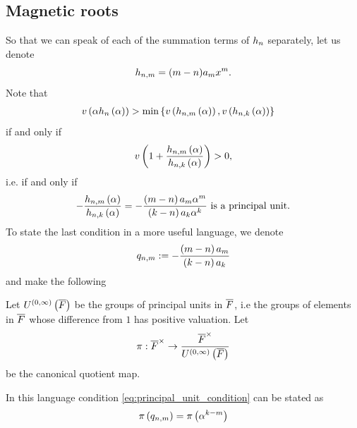 \documentclass[../main.tex]{subfiles}
\begin{document}
  \subsection{Magnetic roots}
  So that we can speak of each of the summation terms of $h_{n}$ separately, let us denote
  \[
    h_{n,m} = (m - n) a_m x^m.
  \]
  Note that 
  \begin{align}
    \label{eq:valuation_inequality_condition}
    & v\left( \alpha h_{n}\left( \alpha \right) \right) 
    > 
    \min\left\{  
      v\left( h_{n,m}\left( \alpha \right) \right), 
      v\left( h_{n,k}\left( \alpha \right)\right)
    \right\}
  \end{align}
  if and only if
  \begin{equation}
    \label{eq:valuation_positivity_condition}
    v\left( 1 + \frac{h_{n,m}\left( \alpha \right)}{h_{n,k}\left( \alpha \right)} \right) > 0,
  \end{equation}
  i.e. if and only if 
  \begin{equation}
    \label{eq:principal_unit_condition}
    -\frac{h_{n,m}\left( \alpha \right)}{h_{n,k}\left( \alpha \right)}
    =
    -\frac{
      \left( m - n \right)a_m \alpha^m
    }{
      \left( k - n \right)a_k \alpha^k
    }
    \text{ is a principal unit.}
  \end{equation}
  To state the last condition in a more useful language, we denote 
  \[
    q_{n, m} 
    :=
    -\frac{
      \left( m - n \right)a_m
    }{
      \left( k - n \right)a_k
    } 
  \]
  and make the following
  \begin{definition}
    \label{def:pi}
    Let $U^{\left( 0,\infty \right)}\left( \overline{F} \right)$ be the groups of principal units in $\overline{F}$, i.e the groups of elements in $\overline{F}$ whose difference from $1$ has positive valuation. 
    Let 
    \[
      \pi: \overline{F}^\times \to \frac{\overline{F}^\times}{U^{\left( 0,\infty \right)}\left( \overline{F} \right)}
    \]
    be the canonical quotient map. 
  \end{definition} 
  In this language condition \cref{eq:principal_unit_condition} can be stated as
  \begin{equation}
    \label{eq:mod_principal_units_condition}
    \pi\left(  
      q_{n, m}
    \right) = 
    \pi\left( \alpha^{k - m} \right)
  \end{equation}
\end{document}
